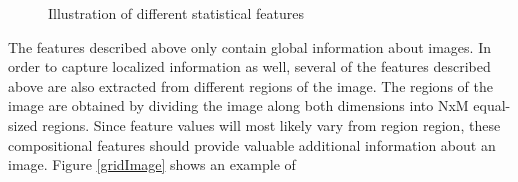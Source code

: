 \begin{figure}[!h]
\begin{center}

  \end{center}
  \caption{Illustration of different statistical features}
  \label{featureImg}
\end{figure}


The features described above only contain global information about images. In order to capture localized information as well, several of the features described above are also extracted from different regions of the image. The regions of the image are obtained by dividing the image along both dimensions into NxM equal-sized regions. Since feature values will most likely vary from region region, these compositional features should provide valuable additional information about an image. Figure \ref{gridImage} shows an example of 

